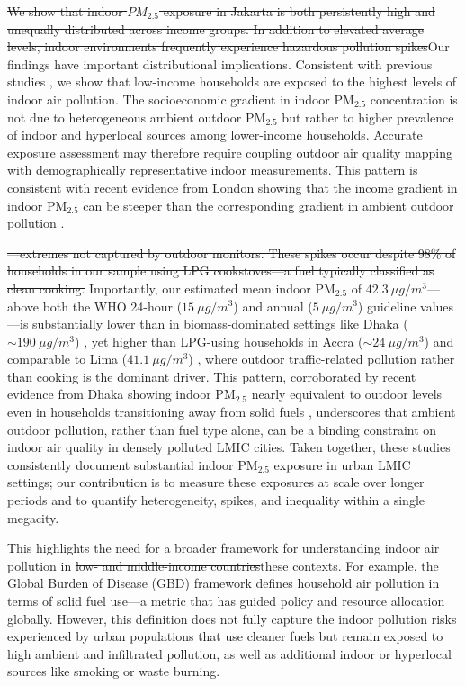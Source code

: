 \documentclass[reqno,12pt,notitlepage]{article}
\providecommand{\DIFadd}[1]{{\protect\color{BLUE}#1}} %
\providecommand{\DIFdel}[1]{{\protect\color{red}\sout{#1}}} %
\providecommand{\DIFaddbegin}{} %
\providecommand{\DIFaddend}{} %
\providecommand{\DIFdelbegin}{} %
\providecommand{\DIFdelend}{} %
\begin{document}
\DIFdel{We show that indoor $PM_{2.5}$ exposure in Jakarta is both persistently high and unequally distributed across income groups.
In addition to elevated average levels, indoor environments frequently experience hazardous pollution spikes}\DIFdelend \DIFaddbegin \DIFadd{Our findings have important distributional implications. Consistent with previous studies \citep{greenstone_indoor_2021, burke_exposures_2022, ito_willingness_2020}, we show that low-income households are exposed to the highest levels of indoor air pollution. 
The socioeconomic gradient in indoor PM$_{2.5}$ concentration is not due to heterogeneous ambient outdoor PM$_{2.5}$ but rather to higher prevalence of indoor and hyperlocal sources among lower-income households. Accurate exposure assessment may therefore require coupling outdoor air quality mapping with demographically representative indoor measurements. This pattern is consistent with recent evidence from London showing that the income gradient in indoor PM$_{2.5}$ can be steeper than the corresponding gradient in ambient outdoor pollution \citep{metcalfe_making_2025}.
}\DIFaddend 

\DIFdelbegin \DIFdel{---extremes not captured by outdoor monitors. These spikes occur despite 98\% of households in our sample using LPG cookstoves---a fuel typically classified as clean cooking.
}\DIFdelend \DIFaddbegin \DIFadd{Importantly, our estimated mean indoor PM$_{2.5}$ of $42.3~\mu g/m^3$---above both the WHO 24-hour ($15~\mu g/m^3$) and annual ($5~\mu g/m^3$) guideline values---is substantially lower than in biomass-dominated settings like Dhaka ($\sim 190~\mu g/m^3$) \citep{GURLEY201311}, yet higher than LPG-using households in Accra ($\sim 24~\mu g/m^3$) \citep{zhou2011household} and comparable to Lima ($41.1~\mu g/m^3$) \citep{kephart2020indoor}, where outdoor traffic-related pollution rather than cooking is the dominant driver. This pattern, corroborated by recent evidence from Dhaka showing indoor PM$_{2.5}$ nearly equivalent to outdoor levels even in households transitioning away from solid fuels \citep{Sahaetal2025}, underscores that ambient outdoor pollution, rather than fuel type alone, can be a binding constraint on indoor air quality in densely polluted LMIC cities. Taken together, these studies consistently document substantial indoor PM$_{2.5}$ exposure in urban LMIC settings; our contribution is to measure these exposures at scale over longer periods and to quantify heterogeneity, spikes, and inequality within a single megacity.
}

\DIFaddend This highlights the need for a broader framework for understanding indoor air pollution in \DIFdelbegin \DIFdel{low- and middle-income countries}\DIFdelend \DIFaddbegin \DIFadd{these contexts}\DIFaddend . For example, the Global Burden of Disease (GBD) framework defines household air pollution in terms of solid fuel use---a metric that has guided policy and resource allocation globally. However, this definition does not fully capture the indoor pollution risks experienced by urban populations that use cleaner fuels but remain exposed to high ambient and infiltrated pollution\DIFaddbegin \DIFadd{, as well as additional indoor or hyperlocal sources like smoking or waste burning}\DIFaddend . 
\end{document}

